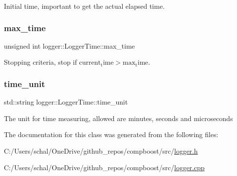 Initial time, important to get the actual elapsed time. 

\mbox{\label{classlogger_1_1_logger_time_a1aec07a58b6d91c7931e627fc25018ff}} 
\subsubsection{\texorpdfstring{max\+\_\+time}{max\_time}}
{\footnotesize\ttfamily unsigned int logger\+::\+Logger\+Time\+::max\+\_\+time\hspace{0.3cm}{\ttfamily [private]}}



Stopping criteria, stop if $\mathrm{current_time} > \mathrm{max_time}$. 

\mbox{\label{classlogger_1_1_logger_time_a98bc56e547f8f32a3db03907347335da}} 
\subsubsection{\texorpdfstring{time\+\_\+unit}{time\_unit}}
{\footnotesize\ttfamily std\+::string logger\+::\+Logger\+Time\+::time\+\_\+unit\hspace{0.3cm}{\ttfamily [private]}}



The unit for time measuring, allowed are {\ttfamily minutes}, {\ttfamily seconds} and {\ttfamily microseconds} 



The documentation for this class was generated from the following files\+:\begin{DoxyCompactItemize}
\item 
C\+:/\+Users/schal/\+One\+Drive/github\+\_\+repos/compboost/src/\mbox{\hyperlink{logger_8h}{logger.\+h}}\item 
C\+:/\+Users/schal/\+One\+Drive/github\+\_\+repos/compboost/src/\mbox{\hyperlink{logger_8cpp}{logger.\+cpp}}\end{DoxyCompactItemize}
